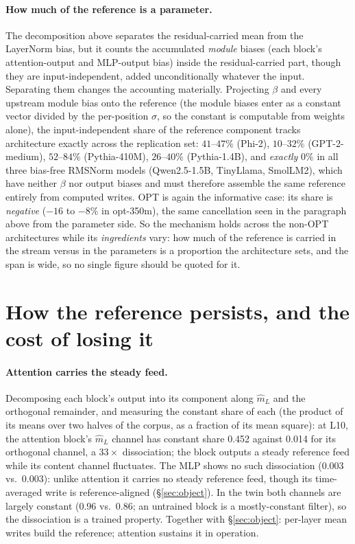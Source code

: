\documentclass[11pt]{article}
\newcommand{\mhat}{\hat{m}}
\begin{document}
\paragraph{How much of the reference is a parameter.} The decomposition
above separates the residual-carried mean from the LayerNorm bias,
but it counts the accumulated \emph{module} biases (each block's
attention-output and MLP-output bias) inside the residual-carried
part, though they are input-independent, added unconditionally whatever
the input. Separating them changes the accounting materially. Projecting
$\beta$ and every upstream module bias onto the reference (the module
biases enter as a constant vector divided by the per-position $\sigma$,
so the constant is computable from weights alone), the input-independent
share of the reference component tracks architecture exactly across the
replication set: $41$--$47\%$ (Phi-2), $10$--$32\%$ (GPT-2-medium), $52$--$84\%$ (Pythia-410M),
$26$--$40\%$ (Pythia-1.4B), and \emph{exactly} $0\%$ in all three
bias-free RMSNorm models (Qwen2.5-1.5B, TinyLlama, SmolLM2), which have
neither $\beta$ nor output biases and must therefore assemble the same
reference entirely from computed writes. OPT is again the informative
case: its share is \emph{negative} ($-16$ to $-8\%$ in opt-350m), the same
cancellation seen in the paragraph above from the parameter side. So the
mechanism holds across the non-OPT architectures while its
\emph{ingredients} vary: how much of the reference is carried in the stream versus in the
parameters is a proportion the architecture sets, and the
span is wide, so no single figure should be quoted for it.

\section{How the reference persists, and the cost of losing it}
\label{sec:maintenance}

\paragraph{Attention carries the steady feed.} Decomposing each
block's output into its component along $\mhat_L$ and the orthogonal
remainder, and measuring the constant share of each (the product of its means over two
halves of the corpus, as a fraction of its mean square): at
L10, the attention block's $\mhat_L$ channel has constant share 0.452
against 0.014 for its orthogonal channel, a $33\times$ dissociation;
the block outputs a steady reference feed while its content channel
fluctuates. The MLP shows no such dissociation (0.003 vs.\ 0.003): unlike
attention it carries no steady reference feed, though its time-averaged
write is reference-aligned (\S\ref{sec:object}). In the twin both channels are largely constant (0.96
vs.\ 0.86; an untrained block is a mostly-constant filter), so the
dissociation is a trained property. Together with \S\ref{sec:object}:
per-layer mean writes build the reference; attention sustains it in
operation.
\end{document}
